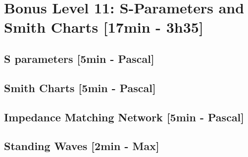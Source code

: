 
\section{Bonus Level 11: S-Parameters and Smith Charts [17min - 3h35]}
\subsection{S parameters [5min - Pascal]}
\subsection{Smith Charts [5min - Pascal]}
\subsection{Impedance Matching Network [5min - Pascal]}
\subsection{Standing Waves [2min - Max]}